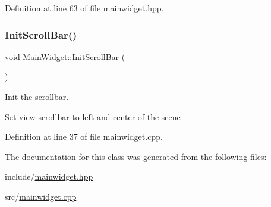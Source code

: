 Definition at line 63 of file mainwidget.\+hpp.

\mbox{\label{classMainWidget_af544f3b04a81d63c0810a90706773d3d}} 
\subsubsection{\texorpdfstring{Init\+Scroll\+Bar()}{InitScrollBar()}}
{\footnotesize\ttfamily void Main\+Widget\+::\+Init\+Scroll\+Bar (\begin{DoxyParamCaption}{ }\end{DoxyParamCaption})}



Init the scrollbar. 

Set view scrollbar to left and center of the scene 

Definition at line 37 of file mainwidget.\+cpp.



The documentation for this class was generated from the following files\+:\begin{DoxyCompactItemize}
\item 
include/\mbox{\hyperlink{mainwidget_8hpp}{mainwidget.\+hpp}}\item 
src/\mbox{\hyperlink{mainwidget_8cpp}{mainwidget.\+cpp}}\end{DoxyCompactItemize}
